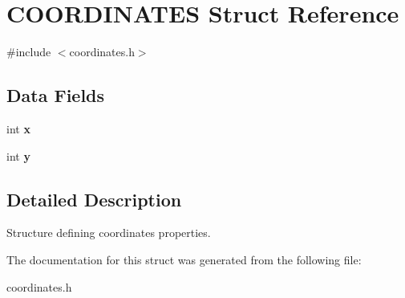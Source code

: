 \hypertarget{struct_c_o_o_r_d_i_n_a_t_e_s}{}\section{C\+O\+O\+R\+D\+I\+N\+A\+T\+ES Struct Reference}
\label{struct_c_o_o_r_d_i_n_a_t_e_s}


{\ttfamily \#include $<$coordinates.\+h$>$}

\subsection*{Data Fields}
\begin{DoxyCompactItemize}
\item 
\mbox{\label{struct_c_o_o_r_d_i_n_a_t_e_s_a6150e0515f7202e2fb518f7206ed97dc}} 
int {\bfseries x}
\item 
\mbox{\label{struct_c_o_o_r_d_i_n_a_t_e_s_a0a2f84ed7838f07779ae24c5a9086d33}} 
int {\bfseries y}
\end{DoxyCompactItemize}


\subsection{Detailed Description}
Structure defining coordinates\textquotesingle{} properties. 

The documentation for this struct was generated from the following file\+:\begin{DoxyCompactItemize}
\item 
coordinates.\+h\end{DoxyCompactItemize}
